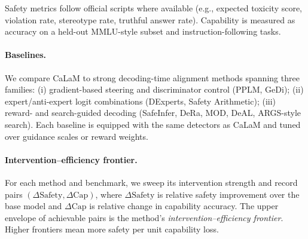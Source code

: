 \documentclass{article}
\theoremstyle{plain}
\theoremstyle{definition}
\theoremstyle{remark}
\begin{document}
\begin{table}[t]
  \caption{Benchmarks used in our evaluation.}
  \label{tab:datasets}
  \vskip 0.1in
  \centering
\end{table}

Safety metrics follow official scripts where available (e.g., expected toxicity score, violation rate, stereotype rate, truthful answer rate).
Capability is measured as accuracy on a held-out MMLU-style subset and instruction-following tasks.

\paragraph{Baselines.}
We compare CaLaM to strong decoding-time alignment methods spanning three families:
(i) gradient-based steering and discriminator control (PPLM, GeDi);
(ii) expert/anti-expert logit combinations (DExperts, Safety Arithmetic);
(iii) reward- and search-guided decoding (SafeInfer, DeRa, MOD, DeAL, ARGS-style search).
Each baseline is equipped with the same detectors as CaLaM and tuned over guidance scales or reward weights.

\paragraph{Intervention--efficiency frontier.}
For each method and benchmark, we sweep its intervention strength and record pairs $(\Delta \mathrm{Safety}, \Delta \mathrm{Cap})$, where $\Delta \mathrm{Safety}$ is relative safety improvement over the base model and $\Delta \mathrm{Cap}$ is relative change in capability accuracy.
The upper envelope of achievable pairs is the method's \emph{intervention--efficiency frontier}.
Higher frontiers mean more safety per unit capability loss.
\end{document}
